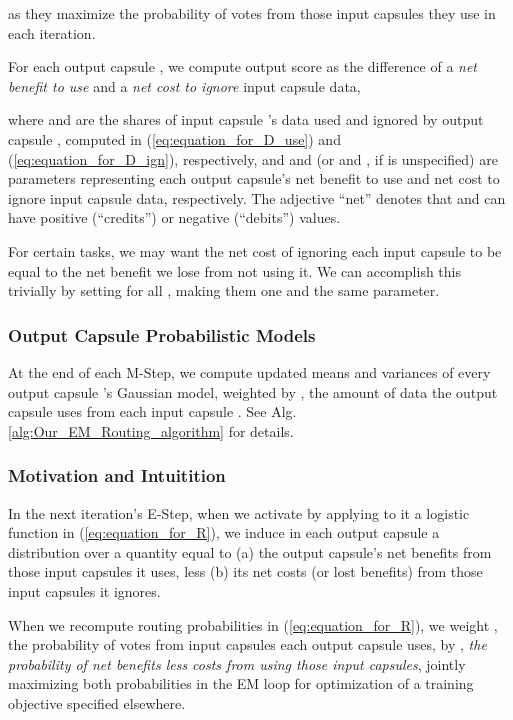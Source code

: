\documentclass[11pt,a4paper]{article}
\begin{document}
as they maximize the probability of votes from those input capsules they use in each iteration.

For each output capsule , we compute output score  as the difference of a \emph{net benefit to use} and a \emph{net cost to ignore} input capsule data,



where  and  are the shares of input capsule 's data used and ignored by output capsule , computed in (\ref{eq:equation_for_D_use}) and (\ref{eq:equation_for_D_ign}), respectively, and  and  (or  and , if  is unspecified) are parameters representing each output capsule's net benefit to use and net cost to ignore input capsule data, respectively. The adjective ``net'' denotes  that  and  can have positive (``credits'') or negative (``debits'') values.

For certain tasks, we may want the net cost of ignoring each input capsule to be equal to the net benefit we lose from not using it. We can accomplish this trivially by setting  for all , making them one and the same parameter.

\subsubsection{Output Capsule Probabilistic Models}

At the end of each M-Step, we compute updated means  and variances  of every output capsule 's Gaussian model, weighted by , the amount of data the output capsule uses from each input capsule . See Alg. \ref{alg:Our_EM_Routing_algorithm} for details.

\subsubsection{Motivation and Intuitition}

In the next iteration's E-Step, when we activate  by applying to it a logistic function  in (\ref{eq:equation_for_R}), we induce in each output capsule a distribution  over a quantity equal to (a) the output capsule's net benefits from those input capsules it uses, less (b) its net costs (or lost benefits) from those input capsules it ignores.

When we recompute routing probabilities  in (\ref{eq:equation_for_R}), we weight , the probability of votes from input capsules each output capsule uses, by , {\em the probability of net benefits less costs from using those input capsules}, jointly maximizing both probabilities in the EM loop for optimization of a training objective specified elsewhere.
\end{document}
